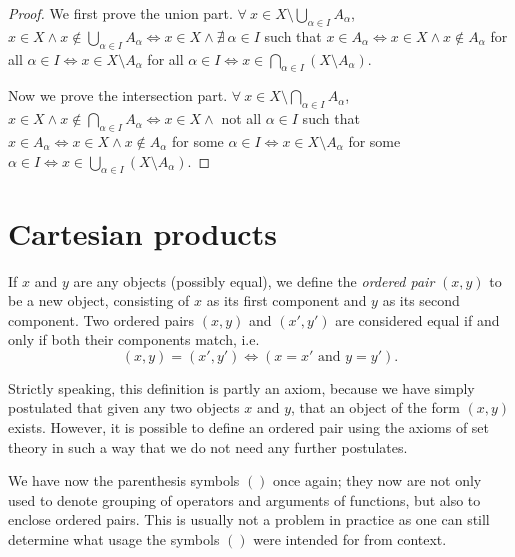 \begin{proof}
We first prove the union part.
\(\forall\ x \in X \setminus \bigcup_{\alpha \in I} A_{\alpha}\), \(x \in X \land x \notin \bigcup_{\alpha \in I} A_{\alpha} \iff x \in X \land \nexists\ \alpha \in I\) such that \(x \in A_{\alpha} \iff x \in X \land x \notin A_{\alpha}\) for all \(\alpha \in I \iff x \in X \setminus A_{\alpha}\) for all \(\alpha \in I \iff x \in \bigcap_{\alpha \in I} (X \setminus A_{\alpha})\).

Now we prove the intersection part.
\(\forall\ x \in X \setminus \bigcap_{\alpha \in I} A_{\alpha}\), \(x \in X \land x \notin \bigcap_{\alpha \in I} A_{\alpha} \iff x \in X \land\) not all \(\alpha \in I\) such that \(x \in A_{\alpha} \iff x \in X \land x \notin A_{\alpha}\) for some \(\alpha \in I \iff x \in X \setminus A_{\alpha}\) for some \(\alpha \in I \iff x \in \bigcup_{\alpha \in I} (X \setminus A_{\alpha})\).
\end{proof}

\section{Cartesian products}

\begin{definition}\label{definition 3.5.1}
If \(x\) and \(y\) are any objects (possibly equal), we define the \emph{ordered pair} \((x, y)\) to be a new object, consisting of \(x\) as its first component and \(y\) as its second component.
Two ordered pairs \((x, y)\) and \((x', y')\) are considered equal if and only if both their components match, i.e.
\[
    (x, y) = (x', y') \iff (x = x' \text{ and } y = y').
\]
\end{definition}

\begin{remark}
Strictly speaking, this definition is partly an axiom, because we have simply postulated that given any two objects \(x\) and \(y\), that an object of the form \((x, y)\) exists.
However, it is possible to define an ordered pair using the axioms of set theory in such a way that we do not need any further postulates.
\end{remark}

\begin{remark}
We have now  the parenthesis symbols \(()\) once again;
they now are not only used to denote grouping of operators and arguments of functions, but also to enclose ordered pairs.
This is usually not a problem in practice as one can still determine what usage the symbols \(()\) were intended for from context.
\end{remark}

